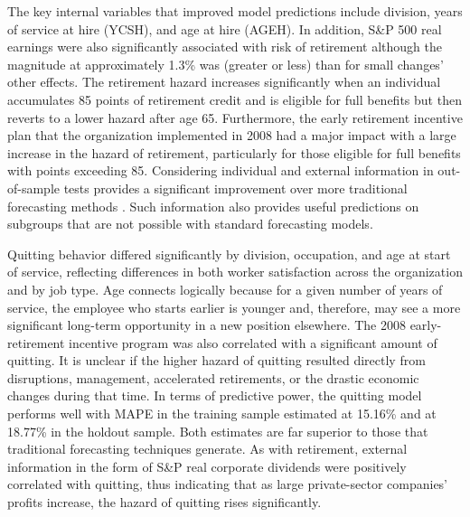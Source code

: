 The key internal variables that improved model predictions include division, years of service at hire (YCSH), and age at hire (AGEH).  In addition, S\&P 500 real earnings were also significantly associated with risk of retirement although the magnitude at approximately 1.3\% was (greater or less) than for small changes' other effects. The retirement hazard increases significantly when an individual accumulates 85 points of retirement credit and is eligible for full benefits but then reverts to a lower hazard after age 65. Furthermore, the early retirement incentive plan that the organization implemented in 2008 had a major impact with a large increase in the hazard of retirement, particularly for those eligible for full benefits with points exceeding 85. Considering individual and external information in out-of-sample tests provides a significant improvement over more traditional forecasting methods  \citet{feldman1994}. Such information also provides useful predictions on subgroups that are not possible with standard forecasting models.

Quitting behavior differed significantly by division, occupation, and age at start of service, reflecting differences in both worker satisfaction across the organization and by job type. Age connects logically because for a given number of years of service, the employee who starts earlier is younger and, therefore, may see a more significant long-term opportunity in a new position elsewhere. The 2008 early-retirement incentive program was also correlated with a significant amount of quitting. It is unclear if the higher hazard of quitting resulted directly from disruptions, management, accelerated retirements, or the drastic economic changes during that time.  In terms of predictive power, the quitting model performs well with MAPE in the training sample estimated at 15.16\% and at 18.77\% in the holdout sample. Both estimates are far superior to those that traditional forecasting techniques generate. As with retirement, external information in the form of S\&P real corporate dividends were positively correlated with quitting, thus indicating that as large private-sector companies' profits increase, the hazard of quitting rises significantly.

